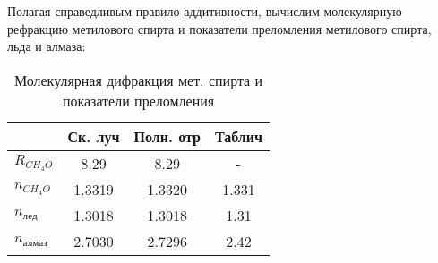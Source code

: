 Полагая справедливым правило аддитивности, вычислим молекулярную рефракцию метилового спирта и показатели преломления метилового спирта, льда и алмаза:
\begin{table}[h!]
	\centering
	\caption{Молекулярная дифракция мет. спирта и показатели преломления}
	\begin{tabular}{|l|c|c|c|}
		\hline
		& \multicolumn{1}{l|}{Ск. луч} & \multicolumn{1}{l|}{Полн. отр} & \multicolumn{1}{l|}{Таблич} \bigstrut\\
		\hline
		$R_{CH_4O}$ & 8.29 & 8.29 & \multicolumn{1}{c|}{-} \bigstrut\\
		\hline
		$n_{CH_4O}$ & 1.3319 & 1.3320& 1.331 \bigstrut\\
		\hline
		$n_{\text{лед}}$ & 1.3018 & 1.3018 & 1.31 \bigstrut\\
		\hline
		$n_{\text{алмаз}}$ & 2.7030 & 2.7296  & 2.42 \bigstrut\\
		\hline
	\end{tabular}%
	\label{tab:addlabel}%
\end{table}%





